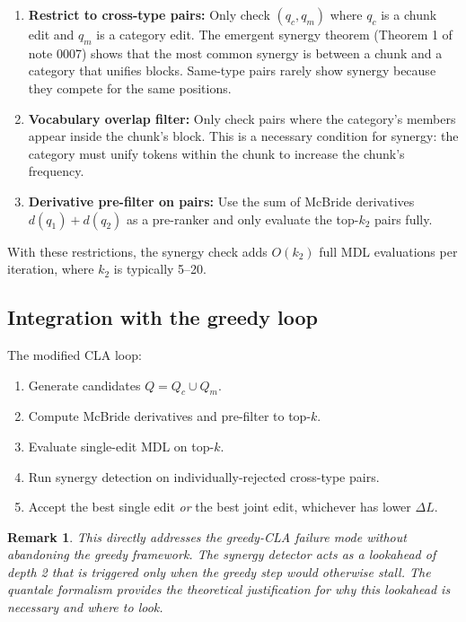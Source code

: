 \documentclass[11pt]{article}
\newtheorem{remark}{Remark}
\begin{document}
\begin{enumerate}
  \item \textbf{Restrict to cross-type pairs:} Only check $(q_c, q_m)$ where $q_c$ is a chunk edit and $q_m$ is a category edit.  The emergent synergy theorem (Theorem 1 of note 0007) shows that the most common synergy is between a chunk and a category that unifies blocks.  Same-type pairs rarely show synergy because they compete for the same positions.
  \item \textbf{Vocabulary overlap filter:} Only check pairs where the category's members appear inside the chunk's block.  This is a necessary condition for synergy: the category must unify tokens within the chunk to increase the chunk's frequency.
  \item \textbf{Derivative pre-filter on pairs:} Use the sum of McBride derivatives $d(q_1) + d(q_2)$ as a pre-ranker and only evaluate the top-$k_2$ pairs fully.
\end{enumerate}

With these restrictions, the synergy check adds $O(k_2)$ full MDL evaluations per iteration, where $k_2$ is typically 5--20.

\subsection{Integration with the greedy loop}

The modified CLA loop:
\begin{enumerate}
  \item Generate candidates $Q = Q_c \cup Q_m$.
  \item Compute McBride derivatives and pre-filter to top-$k$.
  \item Evaluate single-edit MDL on top-$k$.
  \item Run synergy detection on individually-rejected cross-type pairs.
  \item Accept the best single edit \emph{or} the best joint edit, whichever has lower $\Delta L$.
\end{enumerate}

\begin{remark}
This directly addresses the greedy-CLA failure mode without abandoning the greedy framework.  The synergy detector acts as a \emph{lookahead of depth 2} that is triggered only when the greedy step would otherwise stall.  The quantale formalism provides the theoretical justification for why this lookahead is necessary and where to look.
\end{remark}
\end{document}
